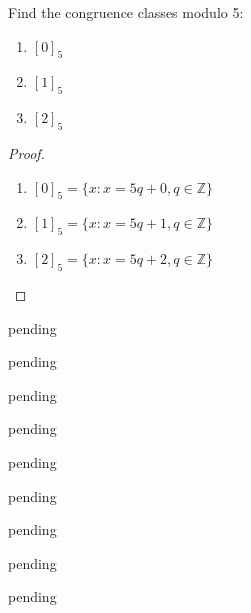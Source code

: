 \begin{exercise} \label{0.68}
	Find the congruence classes modulo 5:
	\begin{enumerate}
	    \item \( [0]_5 \)
	    \item \( [1]_5 \)
	    \item \( [2]_5 \)
	\end{enumerate}
	
	\begin{proof}
	    \begin{enumerate}
	        \item \( [0]_5 = \{ x : x = 5q + 0, q \in \mathbb{Z} \} \)
	        \item \( [1]_5 = \{ x : x = 5q + 1, q \in \mathbb{Z} \} \)
	        \item \( [2]_5 = \{ x : x = 5q + 2, q \in \mathbb{Z} \} \)
	    \end{enumerate}
	\end{proof}
\end{exercise}

\begin{exercise} \label{0.69}
	pending
\end{exercise}

\begin{exercise} \label{0.70}
	pending
\end{exercise}

\begin{exercise} \label{0.71}
	pending
\end{exercise}

\begin{exercise} \label{0.72}
	pending
\end{exercise}

\begin{exercise} \label{0.73}
	pending
\end{exercise}

\begin{exercise} \label{0.74}
	pending
\end{exercise}

\begin{exercise} \label{0.75}
	pending
\end{exercise}

\begin{exercise} \label{0.76}
	pending
\end{exercise}

\begin{exercise} \label{0.77}
	pending
\end{exercise}

